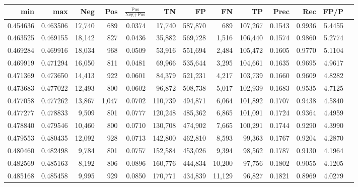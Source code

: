 \begin{tabular}{rrrrrrrrrrrrr}
\toprule
     min &      max &    Neg &   Pos & $\frac{\text{Pos}}{\text{Neg}+\text{Pos}}$ &      TN &      FP &      FN &      TP &   Prec &    Rec &   FP/P \\
\midrule
0.454636 & 0.463506 & 17,740 &   689 &                                     0.0374 &  17,740 & 587,870 &     689 & 107,267 & 0.1543 & 0.9936 & 5.4455 \\
0.463525 & 0.469155 & 18,142 &   827 &                                     0.0436 &  35,882 & 569,728 &   1,516 & 106,440 & 0.1574 & 0.9860 & 5.2774 \\
0.469284 & 0.469916 & 18,034 &   968 &                                     0.0509 &  53,916 & 551,694 &   2,484 & 105,472 & 0.1605 & 0.9770 & 5.1104 \\
0.469919 & 0.471294 & 16,050 &   811 &                                     0.0481 &  69,966 & 535,644 &   3,295 & 104,661 & 0.1635 & 0.9695 & 4.9617 \\
0.471369 & 0.473650 & 14,413 &   922 &                                     0.0601 &  84,379 & 521,231 &   4,217 & 103,739 & 0.1660 & 0.9609 & 4.8282 \\
0.473683 & 0.477022 & 12,493 &   800 &                                     0.0602 &  96,872 & 508,738 &   5,017 & 102,939 & 0.1683 & 0.9535 & 4.7125 \\
0.477058 & 0.477262 & 13,867 & 1,047 &                                     0.0702 & 110,739 & 494,871 &   6,064 & 101,892 & 0.1707 & 0.9438 & 4.5840 \\
0.477277 & 0.478833 &  9,509 &   801 &                                     0.0777 & 120,248 & 485,362 &   6,865 & 101,091 & 0.1724 & 0.9364 & 4.4959 \\
0.478840 & 0.479546 & 10,460 &   800 &                                     0.0710 & 130,708 & 474,902 &   7,665 & 100,291 & 0.1744 & 0.9290 & 4.3990 \\
0.479553 & 0.480435 & 12,092 &   928 &                                     0.0713 & 142,800 & 462,810 &   8,593 &  99,363 & 0.1767 & 0.9204 & 4.2870 \\
0.480460 & 0.482498 &  9,784 &   801 &                                     0.0757 & 152,584 & 453,026 &   9,394 &  98,562 & 0.1787 & 0.9130 & 4.1964 \\
0.482569 & 0.485163 &  8,192 &   806 &                                     0.0896 & 160,776 & 444,834 &  10,200 &  97,756 & 0.1802 & 0.9055 & 4.1205 \\
0.485168 & 0.485458 &  9,995 &   929 &                                     0.0850 & 170,771 & 434,839 &  11,129 &  96,827 & 0.1821 & 0.8969 & 4.0279 \\

\end{tabular}
